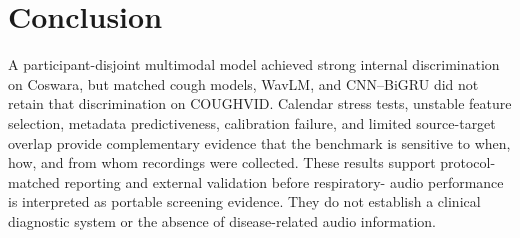 \section{Conclusion}

A participant-disjoint multimodal model achieved strong internal
discrimination on Coswara, but matched cough models, WavLM, and CNN--BiGRU did
not retain that discrimination on COUGHVID. Calendar stress tests, unstable
feature selection, metadata predictiveness, calibration failure, and limited
source-target overlap provide complementary evidence that the benchmark is
sensitive to when, how, and from whom recordings were collected. These results
support protocol-matched reporting and external validation before respiratory-
audio performance is interpreted as portable screening evidence. They do not
establish a clinical diagnostic system or the absence of disease-related audio
information.

